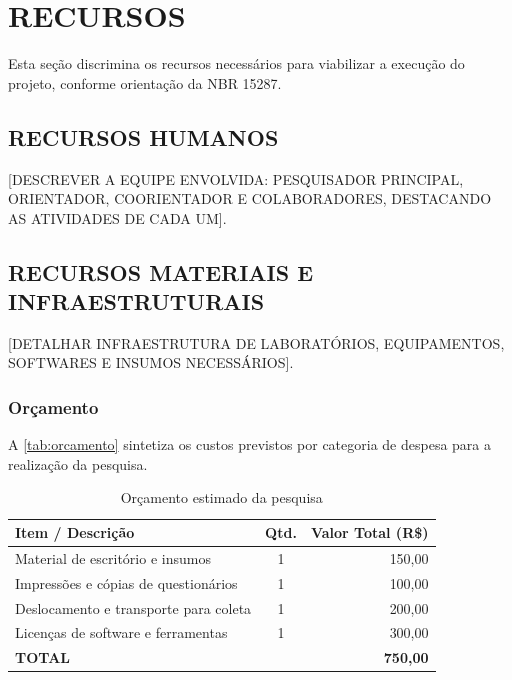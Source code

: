 \documentclass[
    12pt,        %
    openany,     %
    oneside,     %
    a4paper,     %
    english,     %
    french,      %
    spanish,     %
    brazil,      %
    article      %
]{abntex2}
\begin{document}
\section{RECURSOS}
\label{sec:recursos}

Esta seção discrimina os recursos necessários para viabilizar a execução do projeto, conforme orientação da NBR 15287.

\subsection{RECURSOS HUMANOS}
\label{subsec:recursos-humanos}

[DESCREVER A EQUIPE ENVOLVIDA: PESQUISADOR PRINCIPAL, ORIENTADOR, COORIENTADOR E COLABORADORES, DESTACANDO AS ATIVIDADES DE CADA UM].

\subsection{RECURSOS MATERIAIS E INFRAESTRUTURAIS}
\label{subsec:recursos-materiais}

[DETALHAR INFRAESTRUTURA DE LABORATÓRIOS, EQUIPAMENTOS, SOFTWARES E INSUMOS NECESSÁRIOS].

\subsubsection{Orçamento}
\label{subsubsec:orcamento}

A \autoref{tab:orcamento} sintetiza os custos previstos por categoria de despesa para a realização da pesquisa.

\begin{table}[htbp]
    \centering
    \caption{Orçamento estimado da pesquisa}
    \label{tab:orcamento}
    \begin{tabularx}{0.85\textwidth}{Xcr}
        \toprule
        \textbf{Item / Descrição} & \textbf{Qtd.} & \textbf{Valor Total (R\$)} \\
        \midrule
        Material de escritório e insumos & 1 & 150,00 \\
        Impressões e cópias de questionários & 1 & 100,00 \\
        Deslocamento e transporte para coleta & 1 & 200,00 \\
        Licenças de software e ferramentas & 1 & 300,00 \\
        \midrule
        \textbf{TOTAL} & & \textbf{750,00} \\
        \bottomrule
    \end{tabularx}
\end{table}
\end{document}
